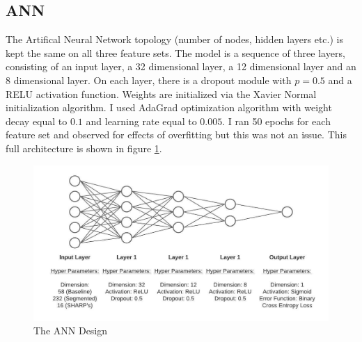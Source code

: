\documentclass[defaultstyle,11pt]{thesis}
\begin{document}
\subsection{ANN}
The Artifical Neural Network topology (number of nodes, hidden layers etc.) is kept the same on all three feature sets. The model is a sequence of three layers, consisting of an input layer, a 32 dimensional layer, a 12 dimensional layer and an 8 dimensional layer. On each layer, there is a dropout module with $p = 0.5$ and a RELU activation function. Weights are initialized via the Xavier Normal initialization algorithm. I used AdaGrad optimization algorithm with weight decay equal to $0.1$ and learning rate equal to $0.005$. I ran 50 epochs for each feature set and observed for effects of overfitting but this was not an issue. This full architecture is shown in figure \ref{fig:ann}.
\begin{figure}[h]
    \centering
    \includegraphics[width=\linewidth]{ThesisFilePkg/figures/methods/ann.jpeg}
    \caption{The ANN Design}
    \label{fig:ann}
\end{figure}
\end{document}
